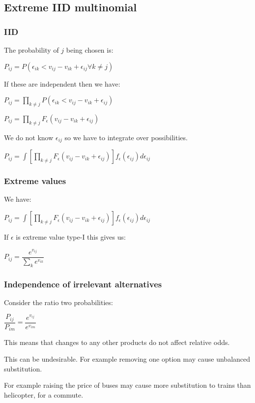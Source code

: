
\subsection{Extreme IID multinomial}

\subsubsection{IID}

The probability of \(j\) being chosen is:

\(P_{ij}=P(\epsilon_{ik} <v_{ij} -v_{ik} +\epsilon_{ij}\forall k\ne j)\)

If these are independent then we have:

\(P_{ij}=\prod_{k\ne j} P(\epsilon_{ik} <v_{ij} -v_{ik} +\epsilon_{ij})\)

\(P_{ij}=\prod_{k\ne j} F_\epsilon (v_{ij} -v_{ik} +\epsilon_{ij})\)

We do not know \(\epsilon_{ij}\) so we have to integrate over possibilities.

\(P_{ij}=\int [\prod_{k\ne j} F_\epsilon (v_{ij} -v_{ik} +\epsilon_{ij})]f_\epsilon(\epsilon_{ij})d\epsilon_{ij}\)

\subsubsection{Extreme values}

We have:

\(P_{ij}=\int [\prod_{k\ne j} F_\epsilon (v_{ij} -v_{ik} +\epsilon_{ij})]f_\epsilon(\epsilon_{ij})d\epsilon_{ij}\)

If \(\epsilon \) is extreme value type-I this gives us:

\(P_{ij}=\dfrac{e^{v_{ij}}}{\sum_k e^{v_{ik}}}\)

\subsubsection{Independence of irrelevant alternatives}

Consider the ratio two probabilities:

\(\dfrac{P_{ij}}{P_{im}}=\dfrac{e^{v_{ij}}}{e^{v_{im}}}\)

This means that changes to any other products do not affect relative odds.

This can be undesirable. For example removing one option may cause unbalanced substitution.

For example raising the price of buses may cause more substitution to trains than helicopter, for a commute.

